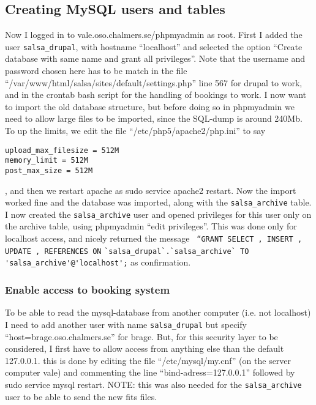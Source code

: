 \subsection{Creating MySQL users and tables}
Now I logged in to vale.oso.chalmers.se/phpmyadmin as root. First I added the
user \verb!salsa_drupal!, with hostname “localhost” and selected the option “Create
database with same name and grant all privileges”. Note that the username and
password chosen here has to be match in the file
“/var/www/html/salsa/sites/default/settings.php” line 567 for drupal to work,
and in the crontab bash script for the handling of bookings to work. I now want
to import the old database structure, but before doing so in phpmyadmin we need
to allow large files to be imported, since the SQL-dump is around 240Mb. To up
the limits, we edit the file “/etc/php5/apache2/php.ini” to say
\begin{verbatim}
upload_max_filesize = 512M
memory_limit = 512M
post_max_size = 512M
\end{verbatim}
, and then we restart apache as sudo service apache2 restart. Now the import
worked fine and the database was imported, along with the \verb!salsa_archive!
table. I now created the \verb!salsa_archive! user and opened privileges for this user
only on the archive table, using phpmyadmin “edit privileges”. This was
done only for localhost access, and nicely returned the message 
\verb! “GRANT SELECT , INSERT , UPDATE , REFERENCES ON! \newline
\verb!`salsa_drupal`.`salsa_archive` TO 'salsa_archive'@'localhost';! 
as confirmation.  
\subsubsection{Enable access to booking system}
To be able to read the mysql-database from
another computer (i.e. not localhost) I need to add another user with name
\verb!salsa_drupal! but specify “host=brage.oso.chalmers.se” for brage. But, for
this security layer to be considered, I first have to allow access from
anything else than the default 127.0.0.1. this is done by editing the file
“/etc/mysql/my.cnf” (on the server computer vale) and commenting the line
“bind-adress=127.0.0.1” followed by sudo service mysql restart. NOTE: this was
also needed for the \verb!salsa_archive! user to be able to send the new fits files.

